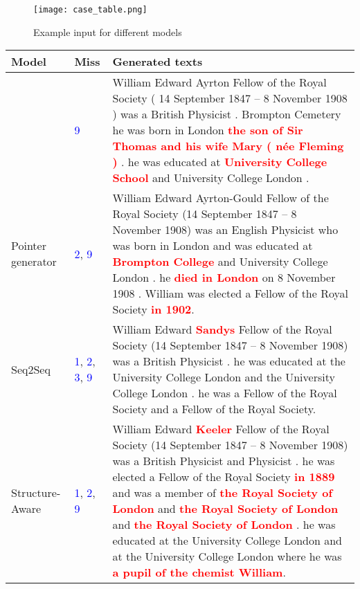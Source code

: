 \documentclass[11pt,a4paper]{article}
\begin{document}
\begin{figure}
    \centering
    \texttt{[image: case\_table.png]}
    \caption{Example input for different models}
    \label{fig:case_table}
\end{figure}

\begin{table*}[t]
    \centering
    \begin{tabularx}{\textwidth}{l|p{2cm}|X}
         Model & Miss & Generated texts\\ 
         \hline
          \cite{Wang2018} &{  \textcolor{blue}{9}}& \small{William Edward Ayrton Fellow of the Royal Society ( 14 September 1847 -- 8 November 1908 ) was a British Physicist . Brompton Cemetery he was born in London\textcolor{red}{\textbf{ the son of Sir Thomas and his wife Mary ( n\'{e}e Fleming )}} . he was educated at \textcolor{red}{\textbf{University College School}} and University College London .}\\
         \hline
         Pointer generator &{ \textcolor{blue}{2},   \textcolor{blue}{9}}& \small{William Edward Ayrton-Gould Fellow of the Royal Society (14 September 1847 -- 8 November 1908) was an English Physicist who was born in London and was educated at \textcolor{red}{\textbf{Brompton College}} and University College London . he \textcolor{red}{\textbf{died in London}} on 8 November 1908 . William was elected a Fellow of the Royal Society  \textcolor{red}{\textbf{in 1902}}.} \\
         \hline
         Seq2Seq &{ \textcolor{blue}{1}, \textcolor{blue}{2},  \textcolor{blue}{3},   \textcolor{blue}{9}}& \small{William Edward \textcolor{red}{\textbf{Sandys}} Fellow of the Royal Society (14 September 1847 -- 8 November 1908) was a British Physicist . he was educated at the University College London and the University College London . he was a Fellow of the Royal Society and a Fellow of the Royal Society. }\\
         \hline
         Structure-Aware &{\textcolor{blue}{1}, \textcolor{blue}{2}, \textcolor{blue}{9}}& \small{William Edward \textcolor{red}{\textbf{Keeler}} Fellow of the Royal Society (14 September 1847 -- 8 November 1908) was a British Physicist and Physicist . he was elected a Fellow of the Royal Society \textcolor{red}{\textbf{in 1889}} and was a member of \textcolor{red}{\textbf{the Royal Society of London}} and \textcolor{red}{\textbf{the Royal Society of London}} and \textcolor{red}{\textbf{the Royal Society of London}} . he was educated at the University College London and at the University College London where he was \textcolor{red}{\textbf{a pupil of the chemist William}}.} \\

\end{tabularx}
\end{table*}
\end{document}
